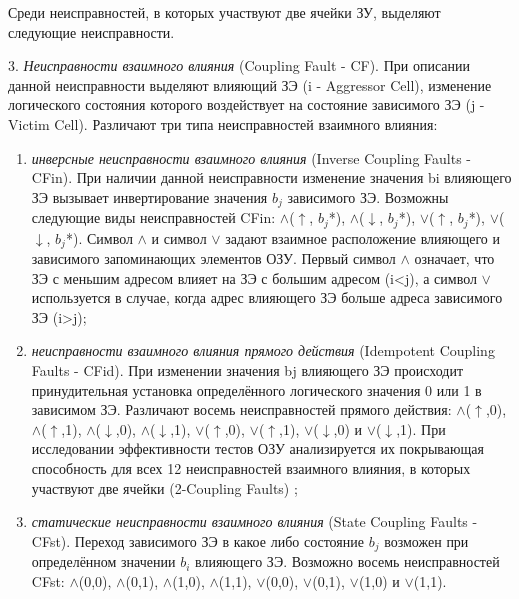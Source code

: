 Среди неисправностей, в которых участвуют две ячейки ЗУ, выделяют следующие неисправности.

3. \textit{Неисправности взаимного влияния} (Coupling Fault - CF). При описании данной неисправности выделяют влияющий ЗЭ (i - Aggressor Cell), изменение логического состояния которого воздействует на состояние зависимого ЗЭ (j - Victim Cell). Различают три типа неисправностей взаимного влияния:
\begin{enumerate}
\item \textit{инверсные неисправности взаимного влияния} (Inverse Coupling Faults - CFin). При наличии данной неисправности изменение значения bi влияющего ЗЭ вызывает инвертирование значения $b_j$ зависимого ЗЭ. Возможны следующие виды неисправностей CFin: $\wedge$($\uparrow$, $b_j$*), $\wedge$($\downarrow$, $b_j$*), $\vee$($\uparrow$, $b_j$*), $\vee$($\downarrow$, $b_j$*). Символ $\wedge$ и символ $\vee$ задают взаимное расположение влияющего и зависимого запоминающих элементов ОЗУ. Первый символ $\wedge$ означает, что ЗЭ с меньшим адресом влияет на ЗЭ с большим адресом (i<j), а символ $\vee$ используется в случае, когда адрес влияющего ЗЭ больше адреса зависимого ЗЭ (i>j);
\item \textit{неисправности взаимного влияния прямого действия} (Idempotent Coupling Faults - CFid). При изменении значения bj влияющего ЗЭ происходит принудительная установка определённого логического значения 0 или 1 в зависимом ЗЭ. Различают восемь неисправностей прямого действия: $\wedge$($\uparrow$,0), $\wedge$($\uparrow$,1), $\wedge$($\downarrow$,0), $\wedge$($\downarrow$,1), $\vee$($\uparrow$,0), $\vee$($\uparrow$,1), $\vee$($\downarrow$,0) и $\vee$($\downarrow$,1). При исследовании эффективности тестов ОЗУ анализируется их покрывающая способность для всех 12 неисправностей взаимного влияния, в которых участвуют две ячейки (2-Coupling Faults) \cite{faults};
\item \textit{статические неисправности взаимного влияния} (State Coupling Faults -CFst). Переход зависимого ЗЭ в какое либо состояние $b_j$ возможен при определённом значении $b_i$ влияющего ЗЭ. Возможно восемь неисправностей CFst: $\wedge$(0,0), $\wedge$(0,1), $\wedge$(1,0), $\wedge$(1,1), $\vee$(0,0), $\vee$(0,1), $\vee$(1,0) и $\vee$(1,1).
\end{enumerate}

